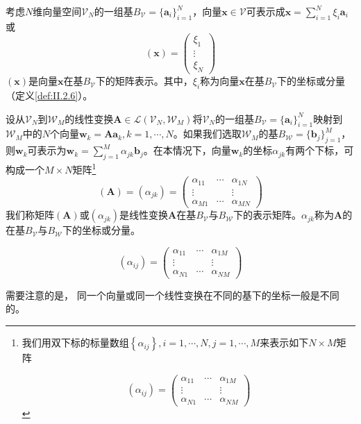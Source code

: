 \documentclass[main.tex]{subfiles}
\begin{document}
考虑$N$维向量空间$\mathcal{V}_N$的一组基$B_\mathcal{V}=\{\mathbf{a}_i\}_{i=1}^N$，向量$\mathbf{x}\in\mathcal{V}$可表示成$\mathbf{x}=\sum_{i=1}^N\xi_i\mathbf{a}_i$或
\[\left(\mathbf{x}\right)=\left(\begin{array}{ccc}\xi_1\\\vdots\\\xi_N\end{array}\right)\]
$\left(\mathbf{x}\right)$是向量$\mathbf{x}$在基$B_\mathcal{V}$下的矩阵表示。其中，$\xi_i$称为向量$\mathbf{x}$在基$B_\mathcal{V}$下的坐标或分量（定义\ref{def:II.2.6}）。

设从$\mathcal{V}_N$到$\mathcal{W}_M$的线性变换$\mathbf{A}\in\mathcal{L}\left(\mathcal{V}_N,\mathcal{W}_M\right)$将$\mathcal{V}_N$的一组基$B_\mathcal{V}=\{\mathbf{a}_i\}_{i=1}^N$映射到$\mathcal{W}_M$中的$N$个向量$\mathbf{w}_k=\mathbf{Aa}_k,k=1,\cdots,N$。如果我们选取$\mathcal{W}_M$的基$B_\mathcal{W}=\{\mathbf{b}_j\}_{j=1}^M$，则$\mathbf{w}_k$可表示为$\mathbf{w}_k=\sum_{j=1}^M\alpha_{jk}\mathbf{b}_j$。在本情况下，向量$\mathbf{w}_k$的坐标$\alpha_{jk}$有两个下标，可构成一个$M\times N$矩阵\footnote{我们用双下标的标量数组$\left\{\alpha_{ij}\right\},i=1,\cdots,N,j=1,\cdots,M$来表示如下$N\times M$矩阵

\[\left(\alpha_{ij}\right)=\left(\begin{array}{ccc}\alpha_{11}&\cdots&\alpha_{1M}\\\vdots&&\vdots\\\alpha_{N1}&\cdots&\alpha_{NM}\end{array}\right)\]}
\[\left(\mathbf{A}\right)=\left(\alpha_{jk}\right)=\left(\begin{array}{ccc}\alpha_{11}&\cdots&\alpha_{1N}\\\vdots&&\vdots\\\alpha_{M1}&\cdots&\alpha_{MN}\end{array}\right)\]
我们称矩阵$\left(\mathbf{A}\right)$或$\left(\alpha_{jk}\right)$是线性变换$\mathbf{A}$在基$B_\mathcal{V}$与$B_\mathcal{W}$下的表示矩阵。$\alpha_{jk}$称为$\mathbf{A}$的在基$B_\mathcal{V}$与$B_\mathcal{W}$下的坐标或分量。

\[\left(\alpha_{ij}\right)=\left(\begin{array}{ccc}\alpha_{11}&\cdots&\alpha_{1M}\\\vdots&&\vdots\\\alpha_{N1}&\cdots&\alpha_{NM}\end{array}\right)\]

需要注意的是， 同一个向量或同一个线性变换在不同的基下的坐标一般是不同的。
\end{document}
